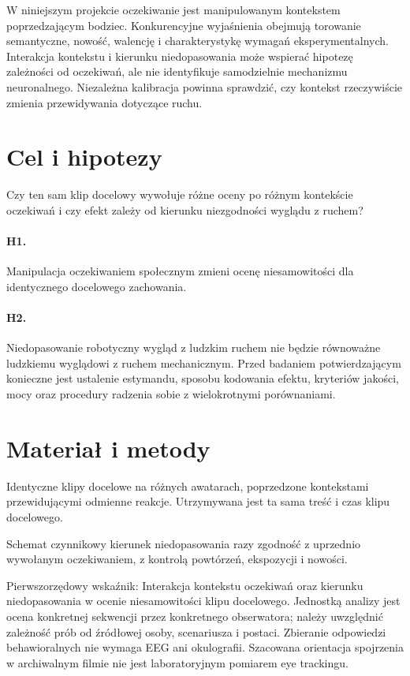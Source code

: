 \documentclass[11pt,a4paper]{article}
\begin{document}
W niniejszym projekcie oczekiwanie jest manipulowanym kontekstem poprzedzającym bodziec. Konkurencyjne wyjaśnienia obejmują torowanie semantyczne, nowość, walencję i charakterystykę wymagań eksperymentalnych. Interakcja kontekstu i kierunku niedopasowania może wspierać hipotezę zależności od oczekiwań, ale nie identyfikuje samodzielnie mechanizmu neuronalnego. Niezależna kalibracja powinna sprawdzić, czy kontekst rzeczywiście zmienia przewidywania dotyczące ruchu.

\section{Cel i hipotezy}
Czy ten sam klip docelowy wywołuje różne oceny po różnym kontekście oczekiwań i czy efekt zależy od kierunku niezgodności wyglądu z ruchem?
\paragraph{H1.} Manipulacja oczekiwaniem społecznym zmieni ocenę niesamowitości dla identycznego docelowego zachowania.
\paragraph{H2.} Niedopasowanie robotyczny wygląd z ludzkim ruchem nie będzie równoważne ludzkiemu wyglądowi z ruchem mechanicznym.
Przed badaniem potwierdzającym konieczne jest ustalenie estymandu, sposobu kodowania efektu, kryteriów jakości, mocy oraz procedury radzenia sobie z wielokrotnymi porównaniami.
\section{Materiał i metody}
Identyczne klipy docelowe na różnych awatarach, poprzedzone kontekstami przewidującymi odmienne reakcje. Utrzymywana jest ta sama treść i czas klipu docelowego.

Schemat czynnikowy kierunek niedopasowania razy zgodność z uprzednio wywołanym oczekiwaniem, z kontrolą powtórzeń, ekspozycji i nowości.

Pierwszorzędowy wskaźnik: Interakcja kontekstu oczekiwań oraz kierunku niedopasowania w ocenie niesamowitości klipu docelowego. Jednostką analizy jest ocena konkretnej sekwencji przez konkretnego obserwatora; należy uwzględnić zależność prób od źródłowej osoby, scenariusza i postaci. Zbieranie odpowiedzi behawioralnych nie wymaga EEG ani okulografii. Szacowana orientacja spojrzenia w archiwalnym filmie nie jest laboratoryjnym pomiarem eye trackingu.
\end{document}
